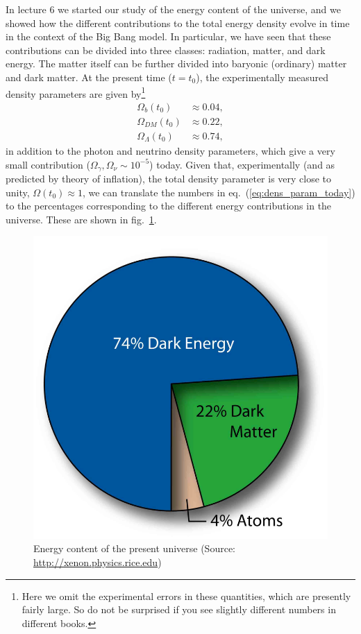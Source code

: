 \documentclass[11pt, a4paper,oneside,openright]{book}
\numberwithin{equation}{section}
\begin{document}
In lecture 6 we started our study of the energy content of the universe, and we showed how the different contributions to the total energy density evolve in time in the context of the Big Bang model. In particular, we have seen that these contributions can be divided into three classes: radiation, matter, and dark energy. The matter itself can be further divided into baryonic (ordinary) matter and dark matter. At the present time ($t=t_0$), the experimentally measured density parameters are given by\footnote{Here we omit the experimental errors in these quantities, which are presently fairly large. So do not be surprised if you see slightly different numbers in different books.}
\begin{equation} \label{eq:dens_param_today}
\begin{split}
\Omega_{b}(t_0)&\approx 0.04,\\
\Omega_{DM}(t_0)&\approx 0.22,\\
\Omega_{\Lambda}(t_0)&\approx 0.74,
\end{split}
\end{equation}
in addition to the photon and neutrino density parameters, which give a very small contribution ($\Omega_{\gamma},\Omega_{\nu}\sim10^{-5}$) today. Given that, experimentally (and as predicted by theory of inflation), the total density parameter is very close to unity, $\Omega(t_0)\approx 1$, we can translate the numbers in eq.\ (\ref{eq:dens_param_today}) to the percentages corresponding to the different energy contributions in the universe. These are shown in fig.\ \ref{fig:lec10_1}.
\begin{figure}[ht]
\begin{center}
\includegraphics[scale=2]{Draw/lec10_1.png}
\end{center}
\caption{Energy content of the present universe (Source: \url{http://xenon.physics.rice.edu})}
\label{fig:lec10_1}
\end{figure}
\end{document}
